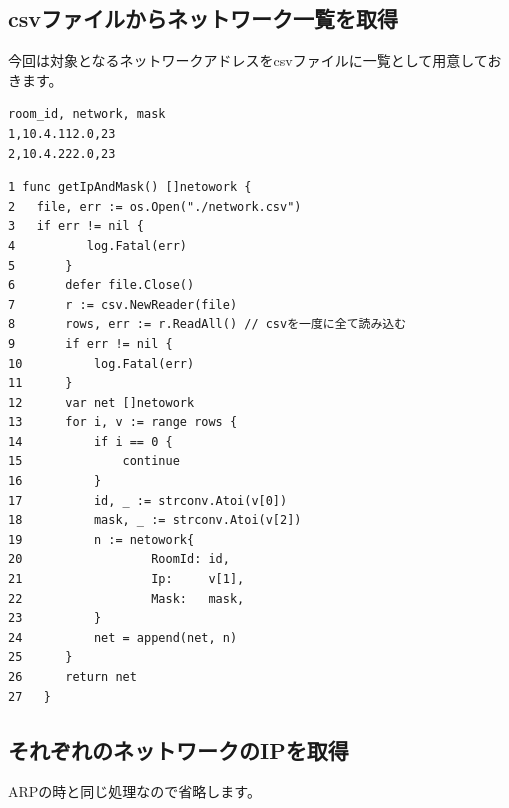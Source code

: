 \subsection{csvファイルからネットワーク一覧を取得}
今回は対象となるネットワークアドレスをcsvファイルに一覧として用意しておきます。
\begin{tcolorbox}[breakable]
    \begin{verbatim}
room_id, network, mask
1,10.4.112.0,23
2,10.4.222.0,23
    \end{verbatim}
\end{tcolorbox}
\begin{tcolorbox}[breakable]
    \begin{verbatim}
1 func getIpAndMask() []netowork {
2   file, err := os.Open("./network.csv")
3   if err != nil {
4	       log.Fatal(err)
5	    }
6	    defer file.Close()
7	    r := csv.NewReader(file)
8	    rows, err := r.ReadAll() // csvを一度に全て読み込む
9	    if err != nil {
10		    log.Fatal(err)
11	    }
12	    var net []netowork
13	    for i, v := range rows {
14		    if i == 0 {
15		    	continue
16		    }
17		    id, _ := strconv.Atoi(v[0])
18		    mask, _ := strconv.Atoi(v[2])
19		    n := netowork{
20			        RoomId: id,
21			        Ip:     v[1],
22			        Mask:   mask,
23		    }
24		    net = append(net, n)
25	    }
26	    return net
27   }
    \end{verbatim}
\end{tcolorbox}

\subsection{それぞれのネットワークのIPを取得}
ARPの時と同じ処理なので省略します。

